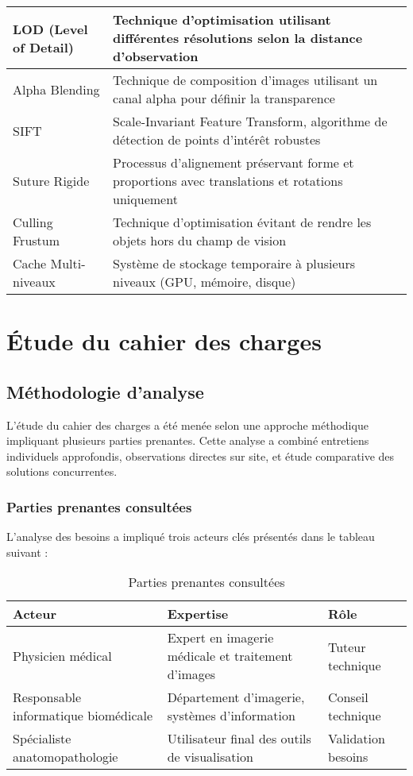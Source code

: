 \documentclass[12pt,a4paper]{report}
\begin{document}
\begin{longtable}{|p{4cm}|p{10cm}|}
LOD (Level of Detail) & Technique d'optimisation utilisant différentes résolutions selon la distance d'observation \\
\hline

Alpha Blending & Technique de composition d'images utilisant un canal alpha pour définir la transparence \\
\hline

SIFT & Scale-Invariant Feature Transform, algorithme de détection de points d'intérêt robustes \\
\hline

Suture Rigide & Processus d'alignement préservant forme et proportions avec translations et rotations uniquement \\
\hline

Culling Frustum & Technique d'optimisation évitant de rendre les objets hors du champ de vision \\
\hline

Cache Multi-niveaux & Système de stockage temporaire à plusieurs niveaux (GPU, mémoire, disque) \\
\hline

\end{longtable}

\section{Étude du cahier des charges}

\subsection{Méthodologie d'analyse}

L'étude du cahier des charges a été menée selon une approche méthodique impliquant plusieurs parties prenantes. Cette analyse a combiné entretiens individuels approfondis, observations directes sur site, et étude comparative des solutions concurrentes.

\subsubsection{Parties prenantes consultées}

L'analyse des besoins a impliqué trois acteurs clés présentés dans le tableau suivant :

\begin{table}[H]
\centering
\begin{tabular}{|p{4cm}|p{8cm}|p{3cm}|}
\hline
\rowcolor{TableHeaderColor}
\textbf{Acteur} & \textbf{Expertise} & \textbf{Rôle} \\
\hline
Physicien médical & Expert en imagerie médicale et traitement d'images & Tuteur technique \\
\hline
Responsable informatique biomédicale & Département d'imagerie, systèmes d'information & Conseil technique \\
\hline
Spécialiste anatomopathologie & Utilisateur final des outils de visualisation & Validation besoins \\
\hline
\end{tabular}
\caption{Parties prenantes consultées}
\end{table}
\end{document}
